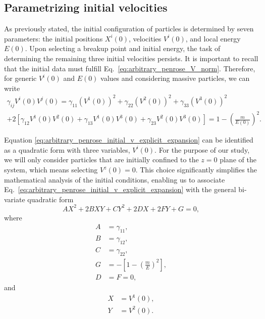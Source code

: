 \subsection{Parametrizing initial velocities}

As previously stated, the initial configuration of particles is determined by seven parameters: the initial positions $X^i(0)$, velocities $V^i(0)$, and local energy $E(0)$. Upon selecting a breakup point and initial energy, the task of determining the remaining three initial velocities persists. It is important to recall that the initial data must fulfill Eq.~\eqref{eq:arbitrary_penrose_V_norm}. Therefore, for generic $V^i(0)$ and $E(0)$ values and considering massive particles, we can write
%
\begin{multline}
  \gamma_{ij} V^{i}(0)V^{j}(0) = \gamma_{11}\left(V^1(0)\right)^2 + \gamma_{22}\left(V^2(0)\right)^2 + \gamma_{33}\left(V^3(0)\right)^2 \\
  + 2\left[ \gamma_{12}V^1(0)V^2(0) + \gamma_{13}V^1(0)V^3(0) + \gamma_{23}V^2(0)V^3(0) \right] = 1-\left(\frac{m}{E(0)}\right)^2.
  \label{eq:arbitrary_penrose_initial_v_explicit_expansion}
\end{multline}

Equation \eqref{eq:arbitrary_penrose_initial_v_explicit_expansion} can be identified as a quadratic form with three variables, $V^i(0)$. For the purpose of our study, we will only consider particles that are initially confined to the $z=0$ plane of the system, which means selecting $V^z(0) = 0$. This choice significantly simplifies the mathematical analysis of the initial conditions, enabling us to associate Eq.~\eqref{eq:arbitrary_penrose_initial_v_explicit_expansion} with the general bi-variate quadratic form
%
\begin{equation}
  A X^2 + 2 B X Y + C Y^2 + 2 D X + 2 F Y + G = 0,
  \label{eq:arbitrary_penrose_general_quadratic_form}
\end{equation}
%
where
%
\begin{align}
  A & = \gamma_{11},                                      \\
  B & = \gamma_{12},                                      \\
  C & = \gamma_{22},                                      \\
  G & = -\left[ 1 - \left( \frac{m}{E} \right)^2 \right], \\
  D & = F = 0,
\end{align}
%
and
%
\begin{align}
  X & = V^1(0),  \\
  Y & = V^2(0).
\end{align}

